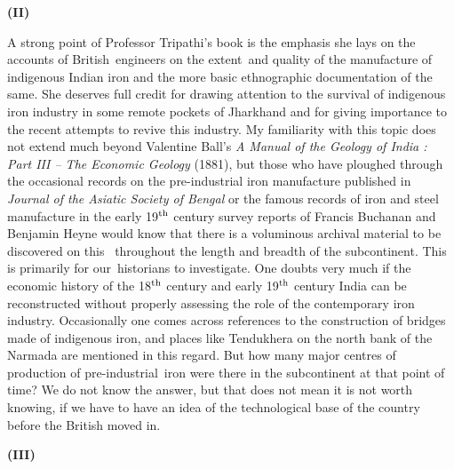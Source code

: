 \vspace{-.3cm}

\begin{center}{\textbf{(II)}}\end{center}

\vspace{-.3cm}

A strong point of Professor Tripathi’s book is the emphasis she lays on the accounts of British engineers on the extent and quality of the manufacture of indigenous Indian iron and the more basic ethnographic documentation of the same. She deserves full credit for drawing attention to the survival of indigenous iron industry in some remote pockets of Jharkhand and for giving importance to the recent attempts to revive this industry. My familiarity with this topic does not extend much beyond Valentine Ball’s \textit{A Manual of the Geology of India : Part III – The Economic Geology} (1881), but those who have ploughed through the occasional records on the pre-industrial iron manufacture published in \textit{Journal of the Asiatic Society of Bengal} or the famous records of iron and steel manufacture in the early 19$^{\rm th}$ century survey reports of Francis Buchanan and Benjamin Heyne would know that there is a voluminous archival material to be discovered on this  throughout the length and breadth of the subcontinent. This is primarily for our historians to investigate. One doubts very much if the economic history of the 18$^{\rm th}$ century and early 19$^{\rm th}$ century India can be reconstructed without properly assessing the role of the contemporary iron industry. Occasionally one comes across references to the construction of bridges made of indigenous iron, and places like Tendukhera on the north bank of the Narmada are mentioned in this regard. But how many major centres of production of pre-industrial iron were there in the subcontinent at that point of time? We do not know the answer, but that does not mean it is not worth knowing, if we have to have an idea of the technological base of the country before the British moved in.

\vspace{-.3cm}

\begin{center}{\textbf{(III)}}\end{center}

\vspace{-.3cm}

